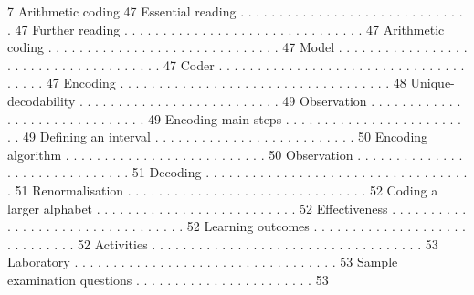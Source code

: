 7 Arithmetic coding 47
Essential reading . . . . . . . . . . . . . . . . . . . . . . . . . . . . . . 47
Further reading . . . . . . . . . . . . . . . . . . . . . . . . . . . . . . . 47
Arithmetic coding . . . . . . . . . . . . . . . . . . . . . . . . . . . . . . 47
Model . . . . . . . . . . . . . . . . . . . . . . . . . . . . . . . . . . . . . 47
Coder . . . . . . . . . . . . . . . . . . . . . . . . . . . . . . . . . . . . . 47
Encoding . . . . . . . . . . . . . . . . . . . . . . . . . . . . . . . . . . . 48
Unique-decodability . . . . . . . . . . . . . . . . . . . . . . . . . . 49
Observation . . . . . . . . . . . . . . . . . . . . . . . . . . . . . . 49
Encoding main steps . . . . . . . . . . . . . . . . . . . . . . . . . 49
Defining an interval . . . . . . . . . . . . . . . . . . . . . . . . . . 50
Encoding algorithm . . . . . . . . . . . . . . . . . . . . . . . . . . 50
Observation . . . . . . . . . . . . . . . . . . . . . . . . . . . . . . 51
Decoding . . . . . . . . . . . . . . . . . . . . . . . . . . . . . . . . . . . 51
Renormalisation . . . . . . . . . . . . . . . . . . . . . . . . . . . . . . . 52
Coding a larger alphabet . . . . . . . . . . . . . . . . . . . . . . . . . . 52
Effectiveness . . . . . . . . . . . . . . . . . . . . . . . . . . . . . . . . . 52
Learning outcomes . . . . . . . . . . . . . . . . . . . . . . . . . . . . . 52
Activities . . . . . . . . . . . . . . . . . . . . . . . . . . . . . . . . . . . 53
Laboratory . . . . . . . . . . . . . . . . . . . . . . . . . . . . . . . . . . 53
Sample examination questions . . . . . . . . . . . . . . . . . . . . . . . 53
